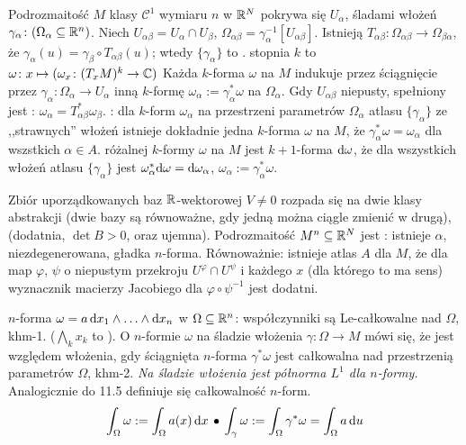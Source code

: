 Podrozmaitość  $M$ klasy $\mathscr C^1$ wymiaru $n$ w $\mathbb{R}^N$ pokrywa się $U_\alpha$, śladami włożeń $\gamma_\alpha \colon (\Omega_\alpha \subseteq \mathbb{R}^n)$.
Niech $U_{\alpha\beta} = U_\alpha \cap U_\beta$, $\Omega_{\alpha \beta} = \gamma_\alpha^{-1} [U_{\alpha \beta}]$.
Istnieją  $T_{\alpha \beta} \colon \Omega_{\alpha \beta} \to \Omega_{\beta \alpha}$, że $\gamma_\alpha(u) = \gamma_\beta \circ T_{\alpha \beta} (u)$; wtedy $\{\gamma_\alpha\}$ to . 
 stopnia $k$ to $\omega \colon x \mapsto (\omega_x \colon (T_xM)^k \to \mathbb{C})$
Każda $k$-forma $\omega$ na $M$ indukuje przez ściągnięcie przez $\gamma_\alpha \colon \Omega_\alpha \to U_\alpha$ inną $k$-formę $\omega_\alpha := \gamma_\alpha^* \omega$ na $\Omega_\alpha$.
Gdy $U_{\alpha \beta}$ niepusty, spełniony jest : $\omega_\alpha = T_{\alpha \beta}^* \omega_\beta$.
: dla $k$-form $\omega_\alpha$ na przestrzeni parametrów $\Omega_\alpha$ atlasu $\{\gamma_\alpha\}$ ze ,,strawnych'' włożeń istnieje dokładnie jedna $k$-forma $\omega$ na $M$, że $\gamma^*_\alpha \omega = \omega_\alpha$ dla wszstkich $\alpha \in A$.
 różalnej $k$-formy $\omega$ na $M$ jest $k+1$-forma $\textrm{d} \omega$, że dla wszystkich włożeń atlasu $\{\gamma_\alpha\}$ jest $\omega_\alpha^* \textrm{d} \omega = \textrm{d} \omega_\alpha$, $\omega_\alpha := \gamma_\alpha^* \omega$.

Zbiór uporządkowanych baz $\mathbb{R}$-wektorowej $V \neq 0$ rozpada się na dwie klasy abstrakcji (dwie bazy są równoważne, gdy jedną można ciągle zmienić w drugą),  (dodatnia, $\det B > 0$, oraz ujemna).
Podrozmaitość $M^n \subseteq \mathbb{R}^N$ jest : istnieje $\alpha$, niezdegenerowana, gładka $n$-forma.
Równoważnie: istnieje atlas $A$ dla $M$, że dla map $\varphi$, $\psi$ o niepustym przekroju $U^\varphi \cap U^\psi$ i każdego $x$ (dla którego to ma sens) wyznacznik macierzy Jacobiego dla $\varphi \circ \psi^{-1}$ jest dodatni.

  $n$-forma $\omega = a \,\textrm{d} x_1 \wedge \ldots \wedge \textrm{d} x_n$ w $\Omega \subseteq \mathbb{R}^n$: współczynniki są Le-całkowalne nad $\Omega$, khm-1. ($\bigwedge_k x_k$ to ).
O $n$-formie $\omega$ na śladzie włożenia $\gamma \colon \Omega \to M$ mówi się, że jest  względem włożenia, gdy ściągnięta $n$-forma $\gamma^* \omega$ jest całkowalna nad przestrzenią parametrów $\Omega$, khm-2.
\emph{Na śladzie włożenia jest półnorma $L^1$ dla $n$-formy.}
Analogicznie do 11.5 definiuje się całkowalność $n$-form.
\[
	\int_\Omega \omega := \int_\Omega a(x) \,\textrm{d} x \, \bullet \,
	\int_\gamma \omega := \int_\Omega \gamma^* \omega = \int_\Omega a \,\textrm{d} u
\]

